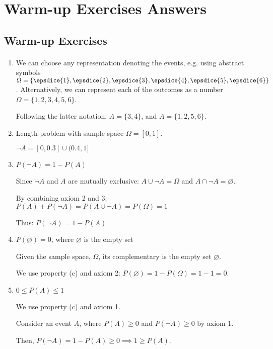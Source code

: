 \section{Warm-up Exercises Answers}
\subsection{Warm-up Exercises}
\paragraph{}
\begin{enumerate}[label=\alph*.]
    \item We can choose any representation denoting the events, e.g. using abstract symbols $\Omega=\{ \epsdice{1}, \epsdice{2}, \epsdice{3}, \epsdice{4}, \epsdice{5}, \epsdice{6} \}$. Alternatively, we can represent each of the outcomes as a number $\Omega = \{1, 2, 3, 4, 5, 6\}$.
    
    Following the latter notation, $A=\{3, 4\}$, and $A=\{1, 2, 5, 6\}$.

	    
    
	\item Length problem with sample space $\Omega=[0,1]$.
	
	$\neg A = [0, 0.3] \cup (0.4,1]$
    
    \item $P(\neg  A) = 1 - P(A)$
    
    Since $\neg A$ and $A$ are mutually exclusive: $A \cup \neg A = \Omega$ and $A \cap \neg A = \varnothing$.

By combining axiom 2 and 3: $P(A) + P(\neg A) = P(A \cup \neg A) = P(\Omega) = 1$

Thus: $P(\neg A) = 1 - P(A)$ 

    \item $P(\varnothing) = 0$, where $\varnothing$ is the empty set
    
Given the sample space, $\Omega$, its complementary is the empty set $\varnothing$. 

We use property (c) and axiom 2: $ P(\varnothing) = 1 - P(\Omega) = 1 - 1 = 0$.

    \item $0 \leq P(A) \leq 1$
    
We use property (c) and axiom 1. 

Consider an event $A$, where $P(A) \geq 0$ and $P(\neg A) \geq 0$ by axiom 1. 

Then, $P(\neg A) = 1 - P(A) \geq 0 \implies 1 \geq P(A)$.


\end{enumerate}

